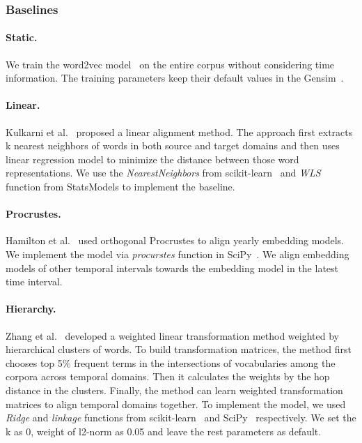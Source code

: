 \subsubsection{Baselines}
\label{chap3:subsec:dweBaselines}


\paragraph{Static.} 
We train the word2vec model~\cite{mikolov2013distributed} on the entire corpus without considering time information.
The training parameters keep their default values in the Gensim~\cite{rehurek2010software}.

\paragraph{Linear.} 
Kulkarni et al.~\cite{kulkarni2015statistically} proposed a linear alignment method. The approach first extracts k nearest neighbors of words in both source and target domains and then uses linear regression model to minimize the distance between those word representations. We use the \textit{NearestNeighbors} from scikit-learn~\cite{pedregosa2011scikit} and \textit{WLS} function from StatsModels to implement the baseline.

\paragraph{Procrustes.} 
Hamilton et al.~\cite{hamilton2016diachronic} used orthogonal Procrustes to align yearly embedding models. We implement the model via \textit{procurstes} function in SciPy~\cite{scipy_2001}. We align embedding models of other temporal intervals towards the embedding model in the latest time interval.

\paragraph{Hierarchy.} 
Zhang et al.~\cite{zhang2017temporal} developed a weighted linear transformation method weighted by hierarchical clusters of words. To build transformation matrices, the method first chooses top 5\% frequent terms in the intersections of vocabularies among the corpora across temporal domains. Then it calculates the weights by the hop distance in the clusters. Finally, the method can learn weighted transformation matrices to align temporal domains together. To implement the model, we used \textit{Ridge} and \textit{linkage} functions from scikit-learn~\cite{pedregosa2011scikit} and SciPy~\cite{scipy_2001} respectively. We set the k as 0, weight of l2-norm as 0.05 and leave the rest parameters as default.


